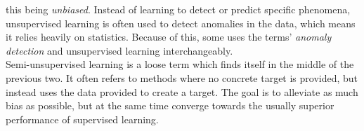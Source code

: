 this being \emph{unbiased}. Instead of learning to detect or predict specific phenomena,
unsupervised learning is often used to detect anomalies in the data, which means it relies
heavily on statistics. Because of this, some uses the terms' \emph{anomaly detection} and 
unsupervised learning interchangeably.
\\
Semi-unsupervised learning is a loose term
which finds itself in the middle of the previous two. It often refers to methods where 
no concrete target is provided, but instead uses the data provided to create a target. The goal 
is to alleviate as much bias as possible, but at the same time converge towards the usually 
superior performance of supervised learning.  